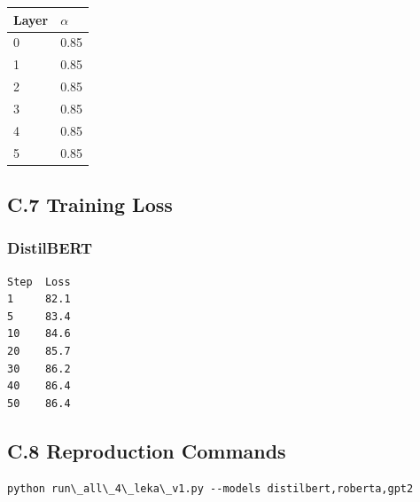 \begin{table}[H]
\centering
\small
\begin{tabular}{ll}
\toprule
\textbf{Layer} & \textbf{$\alpha$} \\
\midrule
0 & 0.85 \\
1 & 0.85 \\
2 & 0.85 \\
3 & 0.85 \\
4 & 0.85 \\
5 & 0.85 \\
\bottomrule
\end{tabular}
\end{table}

\subsection{C.7 Training Loss}

\subsubsection{DistilBERT}
\begin{lstlisting}
Step  Loss
1     82.1
5     83.4
10    84.6
20    85.7
30    86.2
40    86.4
50    86.4
\end{lstlisting}

\subsection{C.8 Reproduction Commands}

\begin{lstlisting}
python run\_all\_4\_leka\_v1.py --models distilbert,roberta,gpt2
\end{lstlisting}

